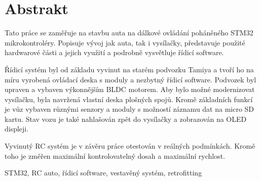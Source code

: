 \section*{Abstrakt}
\vspace{0.5cm}

Tato práce se zaměřuje na stavbu auta na dálkové ovládání poháněného STM32 mikrokontroléry. Popisuje vývoj jak auta, tak i vysílačky, představuje použité hardwarové části a jejich využití a podrobně vysvětluje řídicí software.

Řídicí systém byl od základu vyvinut na starém podvozku Tamiya a tvoří ho na míru vyrobená ovládací deska s moduly a nezbytný řídicí software. Podvozek byl upraven a vybaven výkonnějším BLDC motorem. Aby bylo možné modernizovat vysílačku, byla navržená vlastní deska plošných spojů. Kromě základních funkcí je vůz vybaven různými senzory a moduly s možností záznamu dat na micro SD kartu. Stav vozu je také nahlašován zpět do vysílačky a zobrazován na OLED displeji.

Vyvinutý RC systém je v závěru práce otestován v reálných podmínkách. Kromě toho je změřen maximální kontrolovatelný dosah a maximální rychlost.

\vspace{1cm}
 STM32, RC auto, řídicí software, vestavěný systém, retrofitting
